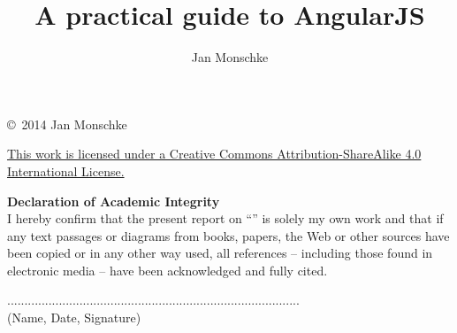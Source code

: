\author{Jan Monschke}
\title{A practical guide to AngularJS}








\thispagestyle{empty}
\phantom{a}
\vfill

\noindent \copyright \ 2014 Jan Monschke

\noindent \href{http://creativecommons.org/licenses/by-sa/4.0/}{This work is licensed under a Creative Commons Attribution-ShareAlike 4.0 International License.}

\vfill





\newpage
\listoffigures
\newpage
\lstlistoflistings




\newpage
\thispagestyle{empty}

\noindent \textbf{Declaration of Academic Integrity}\\


\noindent I hereby confirm that the present report on ``\reporttitle'' is solely my own work and that if any text passages or diagrams from books, papers, the Web or other sources have been copied or in any other way used, all references – including those found in electronic media – have been acknowledged and fully cited.

\vspace*{1.5cm}
\noindent .....................................................................................\\
(Name, Date, Signature)

